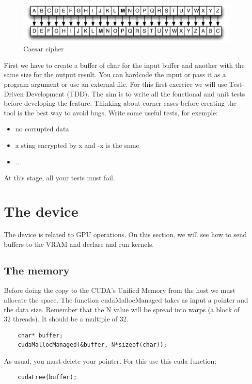 \documentclass{article}
\begin{document}
\begin{figure}[h]
	\centering
	\includegraphics[scale=0.25]{figures/caesar.png}
	\caption{Caesar cipher}
\end{figure}

First we have to create a buffer of char for the input buffer and another with the same size for the output result. You can hardcode the input or pass it as a program argument or use an external file. For this first exercice we will use Test-Driven Development (TDD). The aim is to write all the fonctional and unit tests before developing the feature. Thinking about corner cases before creating the tool is the best way to avoid bugs.
Write some useful tests, for exemple:
\begin{itemize}
	\item no corrupted data
	\item a sting encrypted by x and -x is the same
	\item ...
\end{itemize}
At this stage, all your tests must fail.

\section{The device}
The device is related to GPU operations. On this section, we will see how to send buffers to the VRAM and declare and run kernels. 
\subsection{The memory}
	Before doing the copy to the CUDA's Unified Memory from the host we must allocate the space. The function cudaMallocManaged takes as input a pointer and the data size. Remember that the N value will be spread into warps (a block of 32 threads). It should be a multiple of 32.
\begin{lstlisting}
	char* buffer;
	cudaMallocManaged(&buffer, N*sizeof(char));
\end{lstlisting}
	As usual, you must delete your pointer. For this use this cuda function:
\begin{lstlisting}
	cudaFree(buffer);
\end{lstlisting}
\end{document}
